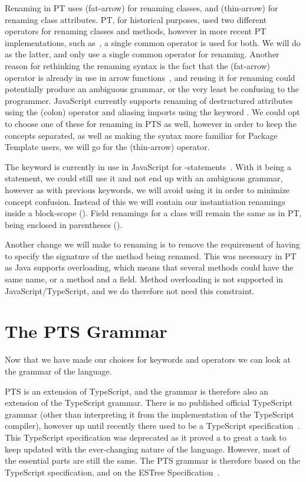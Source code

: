 Renaming in PT uses \codeword{=>}(fat-arrow) for renaming classes, and \codeword{->}(thin-arrow) for renaming class attributes.
PT, for historical purposes, used two different operators for renaming classes and methods, however in more recent PT implementations, such as~\cite{Isene2018}, a single common operator is used for both.
We will do as the latter, and only use a single common operator for renaming.
Another reason for rethinking the renaming syntax is the fact that the \codeword{=>}(fat-arrow) operator is already in use in arrow functions~\cite{arrowfunction}, and reusing it for renaming could potentially produce an ambiguous grammar, or the very least be confusing to the programmer.
JavaScript currently supports renaming of destructured attributes using the \codeword{:}(colon) operator and aliasing imports using the keyword .
We could opt to choose one of these for renaming in PTS as well, however in order to keep the concepts separated, as well as making the syntax more familiar for Package Template users, we will go for the \codeword{->}(thin-arrow) operator.

The  keyword is currently in use in JavaScript for -statements~\cite{with-statement}.
With it being a statement, we could still use it and not end up with an ambiguous grammar, however as with previous keywords, we will avoid using it in order to minimize concept confusion.
Instead of this we will contain our instantiation renamings inside a block-scope (\codeword{\{ \}}).
Field renamings for a class will remain the same as in PT, being enclosed in parentheses (\codeword{( )}).

Another change we will make to renaming is to remove the requirement of having to specify the signature of the method being renamed.
This was necessary in PT as Java supports overloading, which means that several methods could have the same name, or a method and a field.
Method overloading is not supported in JavaScript/TypeScript, and we do therefore not need this constraint.

\section{The PTS Grammar}\label{sec:the-pts-grammar}

Now that we have made our choices for keywords and operators we can look at the grammar of the language.

PTS is an extension of TypeScript, and the grammar is therefore also an extension of the TypeScript grammar.
There is no published official TypeScript grammar (other than interpreting it from the implementation of the TypeScript compiler), however up until recently there used to be a TypeScript specification~\cite{tsspec}.
This TypeScript specification was deprecated as it proved a to great a task to keep updated with the ever-changing nature of the language.
However, most of the essential parts are still the same.
The PTS grammar is therefore based on the TypeScript specification, and on the ESTree Specification~\cite{estreespec}.

